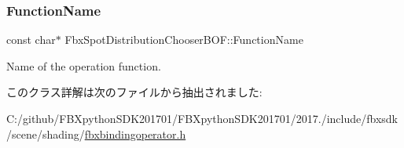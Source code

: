 \subsubsection{\texorpdfstring{Function\+Name}{FunctionName}}
{\footnotesize\ttfamily const char$\ast$ Fbx\+Spot\+Distribution\+Chooser\+B\+O\+F\+::\+Function\+Name\hspace{0.3cm}{\ttfamily [static]}}



Name of the operation function. 



このクラス詳解は次のファイルから抽出されました\+:\begin{DoxyCompactItemize}
\item 
C\+:/github/\+F\+B\+Xpython\+S\+D\+K201701/\+F\+B\+Xpython\+S\+D\+K201701/2017./include/fbxsdk/scene/shading/\hyperlink{fbxbindingoperator_8h}{fbxbindingoperator.\+h}\end{DoxyCompactItemize}
